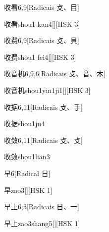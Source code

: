 \begin{entry}{收看}{6,9}[Radicais ⽁、⽬]
  \begin{phonetics}{收看}{shou1 kan4}[][HSK 3]
  \end{phonetics}
\end{entry}

\begin{entry}{收费}{6,9}[Radicais ⽁、⾙]
  \begin{phonetics}{收费}{shou1 fei4}[][HSK 3]
  \end{phonetics}
\end{entry}

\begin{entry}{收音机}{6,9,6}[Radicais ⽁、⾳、⽊]
  \begin{phonetics}{收音机}{shou1yin1ji1}[][HSK 3]
  \end{phonetics}
\end{entry}

\begin{entry}{收据}{6,11}[Radicais ⽁、⼿]
  \begin{phonetics}{收据}{shou1ju4}
  \end{phonetics}
\end{entry}

\begin{entry}{收敛}{6,11}[Radicais ⽁、⽁]
  \begin{phonetics}{收敛}{shou1lian3}
  \end{phonetics}
\end{entry}

\begin{entry}{早}{6}[Radical ⽇]
  \begin{phonetics}{早}{zao3}[][HSK 1]
  \end{phonetics}
\end{entry}

\begin{entry}{早上}{6,3}[Radicais ⽇、⼀]
  \begin{phonetics}{早上}{zao3shang5}[][HSK 1]
  \end{phonetics}
\end{entry}

